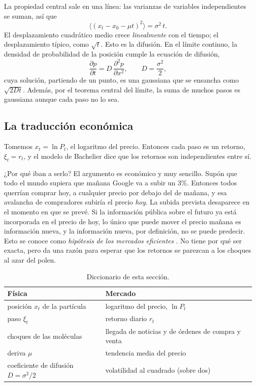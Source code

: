 \documentclass[11pt,a4paper]{article}
\begin{document}
La propiedad central sale en una línea: las varianzas de variables independientes se suman, así que
\begin{equation}
\langle(x_t-x_0-\mu t)^2\rangle=\sigma^2\,t .
\label{eq:difusion}
\end{equation}
El desplazamiento cuadrático medio crece \emph{linealmente} con el tiempo; el desplazamiento típico, como
$\sqrt t$. Esto es la difusión. En el límite continuo, la densidad de probabilidad de la posición cumple la
ecuación de difusión,
\begin{equation}
\frac{\partial p}{\partial t}=D\,\frac{\partial^2p}{\partial x^2},\qquad D=\frac{\sigma^2}{2},
\end{equation}
cuya solución, partiendo de un punto, es una gaussiana que se ensancha como $\sqrt{2Dt}$. Además, por el
teorema central del límite, la suma de muchos pasos es gaussiana aunque cada paso no lo sea.

\subsection{La traducción económica}

Tomemos $x_t=\ln P_t$, el logaritmo del precio. Entonces cada paso es un retorno, $\xi_t=r_t$, y el modelo
de Bachelier dice que los retornos son independientes entre sí.

¿Por qué iban a serlo? El argumento es económico y muy sencillo. Supón que todo el mundo supiera que
mañana Google va a subir un 3\%. Entonces todos querrían comprar hoy, a cualquier precio por debajo del de
mañana, y esa avalancha de compradores subiría el precio \emph{hoy}. La subida prevista desaparece en el
momento en que se prevé. Si la información pública sobre el futuro ya está incorporada en el precio de
hoy, lo único que puede mover el precio mañana es información nueva, y la información nueva, por
definición, no se puede predecir. Esto se conoce como \emph{hipótesis de los mercados eficientes}
\cite{fama1970}. No tiene por qué ser exacta, pero da una razón para esperar que los retornos se parezcan
a los choques al azar del polen.

\begin{table}[ht]
\centering\small
\caption{Diccionario de esta sección.}
\begin{tabular}{@{}ll@{}}
\toprule
Física & Mercado \\
\midrule
posición $x_t$ de la partícula & logaritmo del precio, $\ln P_t$\\
paso $\xi_t$ & retorno diario $r_t$\\
choques de las moléculas & llegada de noticias y de órdenes de compra y venta\\
deriva $\mu$ & tendencia media del precio\\
coeficiente de difusión $D=\sigma^2/2$ & volatilidad al cuadrado (sobre dos)\\
\bottomrule
\end{tabular}
\end{table}
\end{document}
